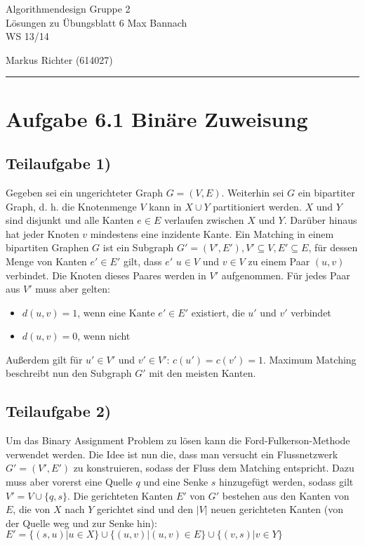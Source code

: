 \documentclass[a4paper, fontsize=10pt]{scrartcl}
\begin{document}
 

{\large Algorithmendesign \hfill Gruppe 2}\\  
{\large Lösungen zu Übungsblatt 6} \hfill Max Bannach\\
{\large WS 13/14}
\begin{flushright}Markus Richter (614027)\end{flushright}
\rule{\textwidth}{.3mm}

\section*{Aufgabe 6.1 Binäre Zuweisung}
\subsection*{Teilaufgabe 1)}
Gegeben sei ein ungerichteter Graph $G=(V,E)$. Weiterhin sei $G$ ein bipartiter Graph, d. h. die Knotenmenge $V$ kann in $X\cup Y$ partitioniert werden. $X$ und $Y$ sind disjunkt und alle Kanten $e\in E$ verlaufen zwischen $X$ und $Y$. Darüber hinaus hat jeder Knoten $v$ mindestens eine inzidente Kante. Ein Matching in einem bipartiten Graphen $G$ ist ein Subgraph $G'=(V',E'), V'\subseteq V, E'\subseteq E$, für dessen Menge von Kanten $e'\in E'$ gilt, dass $e'$ $u\in V$ und $v\in V$ zu einem Paar $(u,v)$ verbindet. Die Knoten dieses Paares werden in $V'$ aufgenommen. Für jedes Paar aus $V'$ muss aber gelten: 
\begin{itemize}
  \item $d(u,v)=1$, wenn eine Kante $e'\in E'$ existiert, die $u'$ und $v'$ verbindet
  \item $d(u,v)=0$, wenn nicht
\end{itemize}

Außerdem gilt für $u'\in V'$ und $v' \in V'$: $c(u')=c(v')=1$. Maximum Matching beschreibt nun den Subgraph $G'$ mit den meisten Kanten. 

\subsection*{Teilaufgabe 2)}
Um das Binary Assignment Problem zu lösen kann die Ford-Fulkerson-Methode verwendet werden. Die Idee ist nun die, dass man versucht ein Flussnetzwerk $G'=(V',E')$ zu konstruieren, sodass der Fluss dem Matching entspricht. Dazu muss aber vorerst eine Quelle $q$ und eine Senke $s$ hinzugefügt werden, sodass gilt $V'=V\cup \{q,s\}$. Die gerichteten Kanten $E'$ von $G'$ bestehen aus den Kanten von $E$, die von $X$ nach $Y$ gerichtet sind und den $|V|$ neuen gerichteten Kanten (von der Quelle weg und zur Senke hin):\\
$E'=\{(s,u)|u\in X\} \cup \{(u,v)|(u,v)\in E\}\cup \{(v,s)|v\in Y\}$
\end{document}
